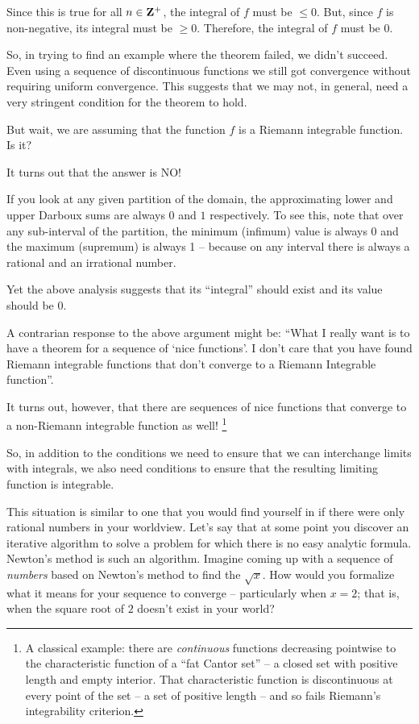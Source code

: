 \documentclass{article}
\begin{document}
Since this is true for all $n \in {\bf Z}^+$, the integral of $f$ must be $\le 0$.
But, since $f$ is non-negative, its integral must be $\ge 0$. Therefore, the 
integral of $f$ must be $0$.

So, in trying to find an example where the theorem failed, we didn't succeed. 
Even using a sequence of discontinuous functions we still got convergence without 
requiring uniform convergence. This suggests that we may not, in general, 
need a very stringent condition for the theorem to hold.

But wait, we are assuming that the function $f$ is a Riemann integrable function. 
Is it?

It turns out that the answer is NO! 

If you look at any given partition of the domain, the approximating lower 
and upper Darboux sums are always
$0$ and $1$ respectively. To see this, note that 
over any sub-interval of the partition, the minimum (infimum) value is always 0 and
the maximum (supremum) is always 1 -- because on any interval there is always a 
rational and an irrational number.

Yet the above analysis suggests that its ``integral'' should exist and its value 
should be $0$.

A contrarian response to the above argument might be:
``What I really want is to have a theorem for a sequence of
`nice functions'. I don't care that you have found Riemann integrable functions that
don't converge to a Riemann Integrable function''.

It turns out, however, that there are sequences of nice functions that converge
to a non-Riemann integrable function as well!%
\footnote{A classical example: there are {\em continuous\/} functions
decreasing pointwise to the characteristic function of a ``fat Cantor set''
-- a closed set with positive length and empty interior. That characteristic
function is discontinuous at every point of the set -- a set of positive
length -- and so fails Riemann's integrability criterion.}

So, in addition to the conditions we need to ensure that we can interchange 
limits with integrals, we also need conditions to ensure that the 
resulting limiting function is integrable.

This situation is similar to one that you would find yourself in if there were 
only rational numbers in your worldview. Let's say that at some point 
you discover an iterative 
algorithm to solve a problem for which there is no easy analytic formula. 
Newton's method is such an algorithm. Imagine coming up with a sequence of {\em numbers\/}
based on Newton's method to find the $\sqrt{x}$. How would you formalize what 
it means for your sequence to converge -- particularly when $x = 2$; that is, when the
square root of $2$ doesn't exist in your world?
\end{document}
